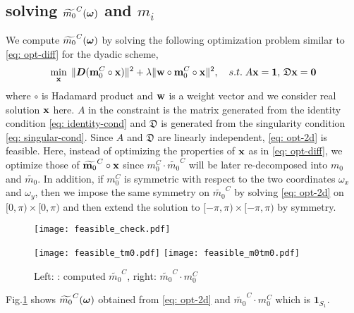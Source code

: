 \subsection{solving $\widetilde{m_{0}}^C(\boldsymbol{\omega})$ and $m_i$}
We compute $\widetilde{m_{0}}^C(\boldsymbol{\omega})$ by solving the following optimization problem similar to \eqref{eq: opt-diff} for the dyadic scheme,
\begin{align}
\min_{\mathbf{x}}\; \Vert \boldsymbol{D}(\mathbf{m}_0^C\circ\mathbf{x})\Vert^2 + \lambda\Vert \mathbf{w}\circ\mathbf{m}_0^C\circ\mathbf{x}\Vert^2,\quad 
s.t. \; A\mathbf{x} = \mathbf{1},\, \mathfrak{D}\mathbf{x} = \mathbf{0}
\label{eq: opt-2d}
\end{align}
where $\circ$ is Hadamard product and $\mathbf{w}$ is a weight vector and we consider real solution $\mathbf{x}$ here.
$A$ in the constraint is the matrix generated from the identity condition \eqref{eq: identity-cond} and $\mathfrak{D}$ is generated from the singularity condition \eqref{eq: singular-cond}. Since $A$ and $\mathfrak{D}$ are linearly independent, \eqref{eq: opt-2d} is feasible. Here, instead of optimizing the properties of $\mathbf{x}$ as in \eqref{eq: opt-diff}, we optimize those of $\widetilde{\mathbf{m}_0}^C\circ \mathbf{x}$ since $m_0^C \cdot\widetilde{m_0}^C$ will be later re-decomposed into $m_0$ and $\widetilde{m_0}$. In addition, if $m_0^C$ is symmetric with respect to the two coordinates $\omega_x$ and $\omega_y$, then we impose the same symmetry on $\widetilde{m_0}^C$ by solving \eqref{eq: opt-2d} on $[0,\pi)\times[0,\pi)$ and then extend the solution to $[-\pi,\pi)\times[-\pi,\pi)$ by symmetry.

\begin{figure}
\centering
\begin{minipage}[c]{.3\textwidth}
\texttt{[image: feasible\_check.pdf]}
\caption{$\vartheta$}\label{fig: feasible}
\end{minipage}
\begin{minipage}[c]{.63\textwidth}%
\centering
\texttt{[image: feasible\_tm0.pdf]}\hspace*{2em}
\texttt{[image: feasible\_m0tm0.pdf]}
\caption{Left: : computed $\widetilde{m_0}^C$, right: $\widetilde{m_0}^C \cdot m_0^C $}
\label{fig: tm0}
\end{minipage}
\end{figure}

Fig.\ref{fig: tm0} shows $\widetilde{m_{0}}^C(\boldsymbol{\omega})$ obtained from \eqref{eq: opt-2d} and $\widetilde{m_0}^C \cdot m_0^C$ which is $\mathbf{1}_{S_1}$.

